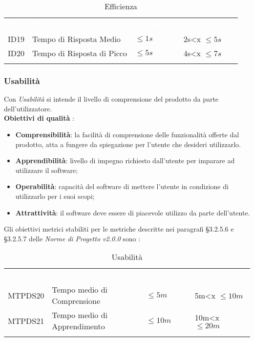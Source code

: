 \begin{longtable}{|C{.15\textwidth}|C{.24\textwidth}|C{.24\textwidth}|C{.24\textwidth}|}
\hline
{}\textbf{\textcolor{white}{ID}} & \textbf{\textcolor{white}{Nome}} & \textbf{\textcolor{white}{Ottimalità}} & \textbf{\textcolor{white}{Accettabilità}}\\
ID19 & Tempo di Risposta Medio & $\leq 1s$ & 2s<x $\leq 5s$\\
\hline
{}ID20 & Tempo di Risposta di Picco  & $\leq 5s$ & 4s<x $\leq 7s$ \\ 
\hline
\caption{Efficienza}
\label{Efficienza}
\end{longtable}



\subsubsection{Usabilità}

Con \textit{Usabilità} si intende il livello di comprensione del prodotto da parte dell'utilizzatore.\\
\textbf{Obiettivi di qualità} :

\begin{itemize}
	\item \textbf{Comprensibilità}: la facilità di comprensione delle funzionalità offerte dal prodotto, atta a fungere da spiegazione per l'utente che desideri utilizzarlo. 
	\item \textbf{Apprendibilità}: livello di impegno richiesto dall'utente per imparare ad utilizzare il software;
	\item \textbf{Operabilità}: capacità del software di mettere l'utente in condizione di utilizzarlo per i suoi scopi; 
	\item \textbf{Attrattività}: il software deve essere di piacevole utilizzo da parte dell'utente.
\end{itemize}

Gli obiettivi metrici stabiliti per le metriche descritte nei paragrafi §3.2.5.6 e §3.2.5.7 delle \textit{Norme di Progetto v2.0.0} sono : 

\begin{longtable}{|C{.15\textwidth}|C{.24\textwidth}|C{.24\textwidth}|C{.24\textwidth}|}
\hline
{}\textbf{\textcolor{white}{ID}} & \textbf{\textcolor{white}{Nome}} & \textbf{\textcolor{white}{Ottimalità}} & \textbf{\textcolor{white}{Accettabilità}}\\
MTPDS20 & Tempo medio di Comprensione & $\leq 5m$ & 5m<x $\leq 10m$\\
\hline
{}MTPDS21 & Tempo medio di Apprendimento & $\leq 10m$ & 10m<x $\leq 20m$ \\ 
\hline
\caption{Usabilità}
\label{Usabilità}
\end{longtable}

